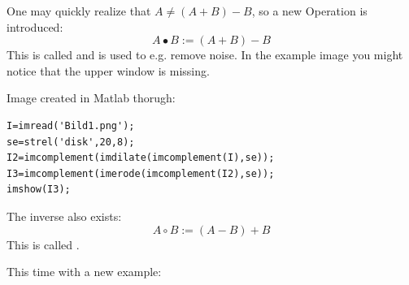 One may quickly realize that $A \neq (A+B)-B$, so a new Operation is introduced:
\[A \bullet B := (A+B)-B\]
This is called  and is used to e.g. remove noise. In the example image you might notice that the upper window is missing.
\begin{center}
\end{center}

Image created in Matlab thorugh:
\begin{lstlisting}
I=imread('Bild1.png');
se=strel('disk',20,8);
I2=imcomplement(imdilate(imcomplement(I),se));
I3=imcomplement(imerode(imcomplement(I2),se));
imshow(I3);
\end{lstlisting}

The inverse also exists:
\[ A \circ B := (A-B)+B\]
This is called .

This time with a new example:

